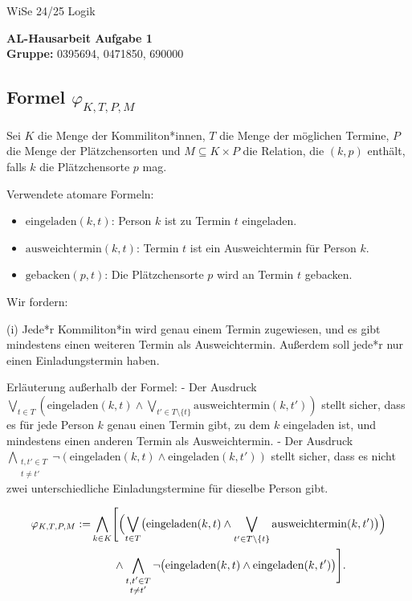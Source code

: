 \documentclass[12pt,a4paper]{article}
\begin{document}
\noindent
\noindent \large WiSe 24/25 \hfill
Logik

\begin{center}
\textbf{AL-Hausarbeit  Aufgabe 1}\\
\vspace*{0.5cm}
\textbf{Gruppe:} 0395694, 0471850, 690000 %

\end{center}

\subsection*{Formel $\varphi_{K,T,P,M}$}

Sei $K$ die Menge der Kommiliton*innen, $T$ die Menge der möglichen Termine, 
$P$ die Menge der Plätzchensorten und $M \subseteq K \times P$ die Relation, 
die $(k,p)$ enthält, falls $k$ die Plätzchensorte $p$ mag.

Verwendete atomare Formeln:
\begin{itemize}
    \item $\text{eingeladen}(k,t)$: Person $k$ ist zu Termin $t$ eingeladen.
    \item $\text{ausweichtermin}(k,t)$: Termin $t$ ist ein Ausweichtermin für Person $k$.
    \item $\text{gebacken}(p,t)$: Die Plätzchensorte $p$ wird an Termin $t$ gebacken.
\end{itemize}

Wir fordern:

(i) Jede*r Kommiliton*in wird genau einem Termin zugewiesen, und es gibt mindestens einen weiteren Termin als Ausweichtermin. Außerdem soll jede*r nur einen Einladungstermin haben.

Erläuterung außerhalb der Formel:  
- Der Ausdruck $\bigvee_{t \in T}(\text{eingeladen}(k,t) \wedge \bigvee_{t' \in T\setminus\{t\}}\text{ausweichtermin}(k,t'))$ stellt sicher, dass es für jede Person $k$ genau einen Termin gibt, zu dem $k$ eingeladen ist, und mindestens einen anderen Termin als Ausweichtermin.  
- Der Ausdruck $\bigwedge_{\substack{t,t' \in T \\ t \neq t'}} \neg(\text{eingeladen}(k,t)\wedge\text{eingeladen}(k,t'))$ stellt sicher, dass es nicht zwei unterschiedliche Einladungstermine für dieselbe Person gibt.

\begin{align*}
\varphi_{K,T,P,M} := 
& \bigwedge_{k \in K}\Biggl[
   \Bigl(
     \bigvee_{t \in T}\bigl(\text{eingeladen}(k,t) \wedge \bigvee_{t' \in T\setminus\{t\}} \text{ausweichtermin}(k,t')\bigr)
   \Bigr) \\
& \qquad\wedge
   \bigwedge_{\substack{t,t' \in T \\ t \neq t'}} 
     \neg\bigl(\text{eingeladen}(k,t)\wedge \text{eingeladen}(k,t')\bigr)
\Biggr].
\end{align*}
\end{document}
